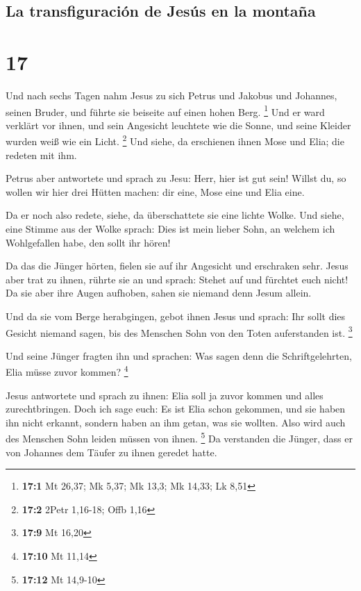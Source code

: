 \hypertarget{la-transfiguraciuxf3n-de-jesuxfas-en-la-montauxf1a}{%
\subsection{La transfiguración de Jesús en la
montaña}\label{la-transfiguraciuxf3n-de-jesuxfas-en-la-montauxf1a}}

\hypertarget{section-16}{%
\section{17}\label{section-16}}

 Und nach sechs Tagen nahm Jesus zu sich Petrus und
Jakobus und Johannes, seinen Bruder, und führte sie beiseite auf einen
hohen Berg. \footnote{\textbf{17:1} Mt 26,37; Mk 5,37; Mk 13,3; Mk
  14,33; Lk 8,51}  Und er ward verklärt vor ihnen, und
sein Angesicht leuchtete wie die Sonne, und seine Kleider wurden weiß
wie ein Licht. \footnote{\textbf{17:2} 2Petr 1,16-18; Offb 1,16}
 Und siehe, da erschienen ihnen Mose und Elia; die redeten
mit ihm.

 Petrus aber antwortete und sprach zu Jesu: Herr, hier ist
gut sein! Willst du, so wollen wir hier drei Hütten machen: dir eine,
Mose eine und Elia eine.

 Da er noch also redete, siehe, da überschattete sie eine
lichte Wolke. Und siehe, eine Stimme aus der Wolke sprach: Dies ist mein
lieber Sohn, an welchem ich Wohlgefallen habe, den sollt ihr hören!

 Da das die Jünger hörten, fielen sie auf ihr Angesicht
und erschraken sehr.  Jesus aber trat zu ihnen, rührte sie
an und sprach: Stehet auf und fürchtet euch nicht!  Da sie
aber ihre Augen aufhoben, sahen sie niemand denn Jesum allein.

 Und da sie vom Berge herabgingen, gebot ihnen Jesus und
sprach: Ihr sollt dies Gesicht niemand sagen, bis des Menschen Sohn von
den Toten auferstanden ist. \footnote{\textbf{17:9} Mt 16,20}

 Und seine Jünger fragten ihn und sprachen: Was sagen
denn die Schriftgelehrten, Elia müsse zuvor kommen? \footnote{\textbf{17:10}
  Mt 11,14}

 Jesus antwortete und sprach zu ihnen: Elia soll ja zuvor
kommen und alles zurechtbringen.  Doch ich sage euch: Es
ist Elia schon gekommen, und sie haben ihn nicht erkannt, sondern haben
an ihm getan, was sie wollten. Also wird auch des Menschen Sohn leiden
müssen von ihnen. \footnote{\textbf{17:12} Mt 14,9-10} 
Da verstanden die Jünger, dass er von Johannes dem Täufer zu ihnen
geredet hatte.

